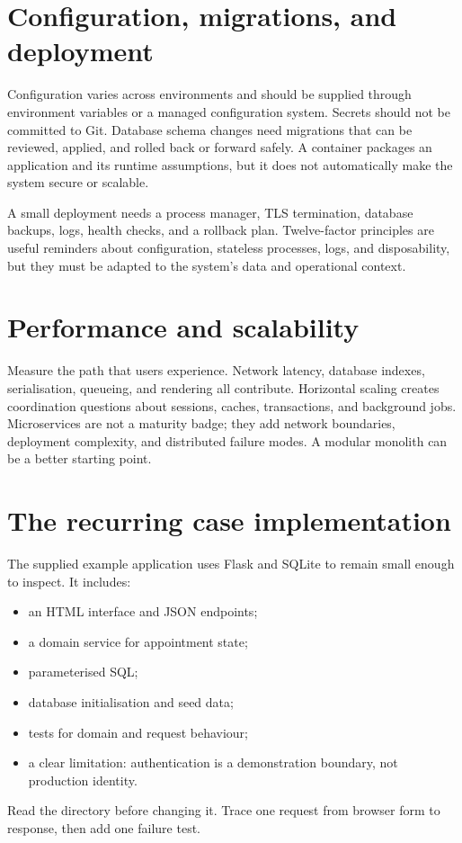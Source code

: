 \section{Configuration, migrations, and deployment}
Configuration varies across environments and should be supplied through environment variables or a managed configuration system. Secrets should not be committed to Git. Database schema changes need migrations that can be reviewed, applied, and rolled back or forward safely. A container packages an application and its runtime assumptions, but it does not automatically make the system secure or scalable.

A small deployment needs a process manager, TLS termination, database backups, logs, health checks, and a rollback plan. Twelve-factor principles are useful reminders about configuration, stateless processes, logs, and disposability, but they must be adapted to the system's data and operational context.

\section{Performance and scalability}
Measure the path that users experience. Network latency, database indexes, serialisation, queueing, and rendering all contribute. Horizontal scaling creates coordination questions about sessions, caches, transactions, and background jobs. Microservices are not a maturity badge; they add network boundaries, deployment complexity, and distributed failure modes. A modular monolith can be a better starting point.

\section{The recurring case implementation}
The supplied example application uses Flask and SQLite to remain small enough to inspect. It includes:
\begin{itemize}
\item an HTML interface and JSON endpoints;
\item a domain service for appointment state;
\item parameterised SQL;
\item database initialisation and seed data;
\item tests for domain and request behaviour;
\item a clear limitation: authentication is a demonstration boundary, not production identity.
\end{itemize}
Read the directory before changing it. Trace one request from browser form to response, then add one failure test.

